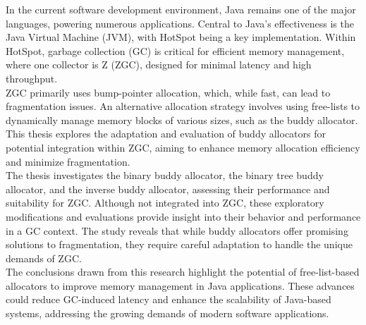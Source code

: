 In the current software development environment, Java remains one of the major languages, powering numerous applications. Central to Java's effectiveness is the Java Virtual Machine (JVM), with HotSpot being a key implementation. Within HotSpot, garbage collection (GC) is critical for efficient memory management, where one collector is Z (ZGC), designed for minimal latency and high throughput. \\

ZGC primarily uses bump-pointer allocation, which, while fast, can lead to fragmentation issues. An alternative allocation strategy involves using free-lists to dynamically manage memory blocks of various sizes, such as the buddy allocator. This thesis explores the adaptation and evaluation of buddy allocators for potential integration within ZGC, aiming to enhance memory allocation efficiency and minimize fragmentation. \\

The thesis investigates the binary buddy allocator, the binary tree buddy allocator, and the inverse buddy allocator, assessing their performance and suitability for ZGC. Although not integrated into ZGC, these exploratory modifications and evaluations provide insight into their behavior and performance in a GC context. The study reveals that while buddy allocators offer promising solutions to fragmentation, they require careful adaptation to handle the unique demands of ZGC. \\

The conclusions drawn from this research highlight the potential of free-list-based allocators to improve memory management in Java applications. These advances could reduce GC-induced latency and enhance the scalability of Java-based systems, addressing the growing demands of modern software applications.

